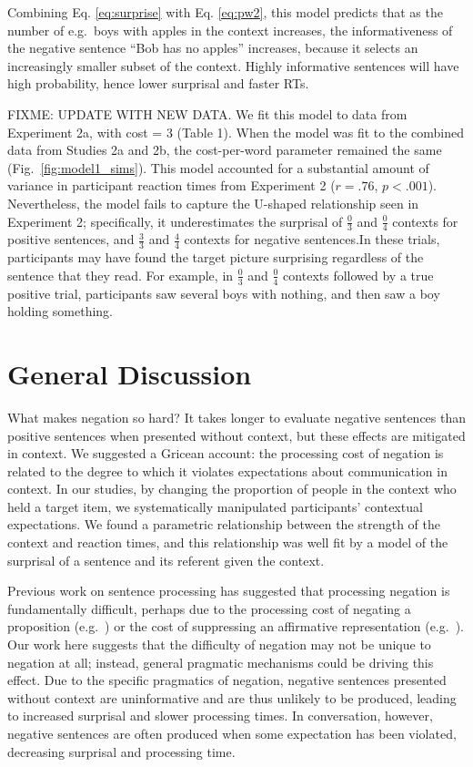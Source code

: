 \documentclass[man]{apa2}
\begin{document}
\noindent Combining Eq. \ref{eq:surprise} with Eq. \ref{eq:pw2}, this model predicts that as the number of e.g.\ boys with apples in the context increases, the informativeness of the negative sentence ``Bob has no apples'' increases, because it selects an increasingly smaller subset of the context. Highly informative sentences will have high probability, hence lower surprisal and faster RTs. 


FIXME: UPDATE WITH NEW DATA.
We fit this model to data from Experiment 2a, with cost = 3 (Table 1).  When the model was fit to the combined data from Studies 2a and 2b, the cost-per-word parameter remained the same (Fig.\ \ref{fig:model1_sims}).  This model accounted for a substantial amount of variance in participant reaction times from Experiment 2 ($r=.76$, $p<.001$).  Nevertheless, the model fails to capture the U-shaped relationship seen in Experiment 2; specifically, it underestimates the surprisal of $\frac{0}{3}$ and $\frac{0}{4}$ contexts for positive sentences, and $\frac{3}{3}$ and $\frac{4}{4}$ contexts for negative sentences.In these trials, participants may have found the target picture surprising regardless of the sentence that they read. For example, in $\frac{0}{3}$ and $\frac{0}{4}$ contexts followed by a true positive trial, participants saw several boys with nothing, and then saw a boy holding something.  


\section{General Discussion}

What makes negation so hard? It takes longer to evaluate negative sentences than positive sentences when presented without context, but these effects are mitigated in context. We suggested a Gricean account: the processing cost of negation is related to the degree to which it violates expectations about communication in context. In our studies, by changing the proportion of people in the context who held a target item, we systematically manipulated participants' contextual expectations.  We found a parametric relationship between the strength of the context and reaction times, and this relationship was well fit by a model of the surprisal of a sentence and its referent given the context.

Previous work on sentence processing has suggested that processing negation is fundamentally difficult, perhaps due to the processing cost of negating a proposition (e.g.\ ) or the cost of suppressing an affirmative representation (e.g.\ ).  Our work here suggests that the difficulty of negation may not be unique to negation at all; instead, general pragmatic mechanisms could be driving this effect.  Due to the specific pragmatics of negation, negative sentences presented without context are uninformative and are thus unlikely to be produced, leading to increased surprisal and slower processing times.  In conversation, however, negative sentences are often produced when some expectation has been violated, decreasing surprisal and processing time.  
\end{document}
